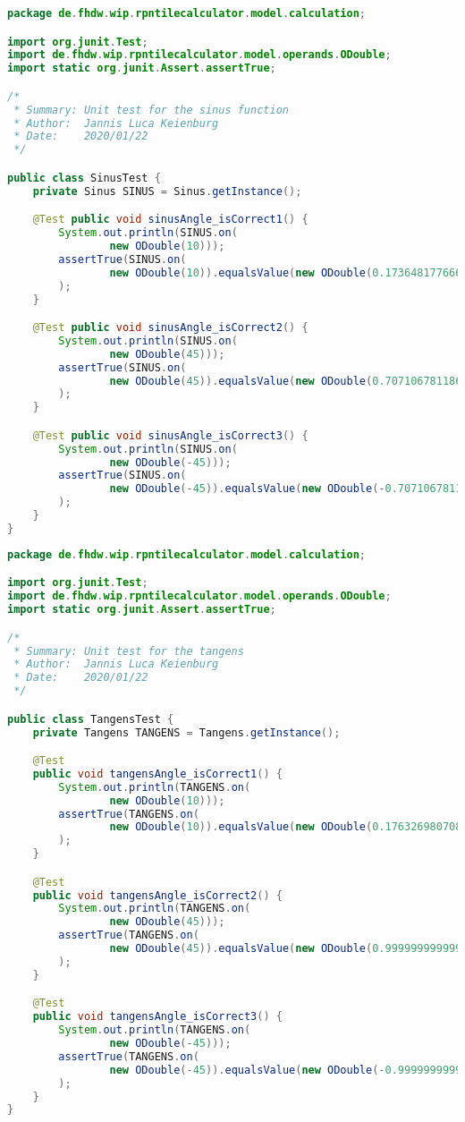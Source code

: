 \begin{lstlisting}[caption=SinusTest (Keienburg),label=list:SinusTest,language=Java]
package de.fhdw.wip.rpntilecalculator.model.calculation;

import org.junit.Test;
import de.fhdw.wip.rpntilecalculator.model.operands.ODouble;
import static org.junit.Assert.assertTrue;

/*
 * Summary: Unit test for the sinus function
 * Author:  Jannis Luca Keienburg
 * Date:    2020/01/22
 */

public class SinusTest {
    private Sinus SINUS = Sinus.getInstance();

    @Test public void sinusAngle_isCorrect1() {
        System.out.println(SINUS.on(
                new ODouble(10)));
        assertTrue(SINUS.on(
                new ODouble(10)).equalsValue(new ODouble(0.17364817766693033))
        );
    }

    @Test public void sinusAngle_isCorrect2() {
        System.out.println(SINUS.on(
                new ODouble(45)));
        assertTrue(SINUS.on(
                new ODouble(45)).equalsValue(new ODouble(0.7071067811865475))
        );
    }

    @Test public void sinusAngle_isCorrect3() {
        System.out.println(SINUS.on(
                new ODouble(-45)));
        assertTrue(SINUS.on(
                new ODouble(-45)).equalsValue(new ODouble(-0.7071067811865475))
        );
    }
}
\end{lstlisting} 

\begin{lstlisting}[caption=TangensTest (Schwenke),label=list:TangensTest,language=Java]
package de.fhdw.wip.rpntilecalculator.model.calculation;

import org.junit.Test;
import de.fhdw.wip.rpntilecalculator.model.operands.ODouble;
import static org.junit.Assert.assertTrue;

/*
 * Summary: Unit test for the tangens
 * Author:  Jannis Luca Keienburg
 * Date:    2020/01/22
 */

public class TangensTest {
    private Tangens TANGENS = Tangens.getInstance();

    @Test
    public void tangensAngle_isCorrect1() {
        System.out.println(TANGENS.on(
                new ODouble(10)));
        assertTrue(TANGENS.on(
                new ODouble(10)).equalsValue(new ODouble(0.17632698070846498))
        );
    }

    @Test
    public void tangensAngle_isCorrect2() {
        System.out.println(TANGENS.on(
                new ODouble(45)));
        assertTrue(TANGENS.on(
                new ODouble(45)).equalsValue(new ODouble(0.9999999999999999))
        );
    }

    @Test
    public void tangensAngle_isCorrect3() {
        System.out.println(TANGENS.on(
                new ODouble(-45)));
        assertTrue(TANGENS.on(
                new ODouble(-45)).equalsValue(new ODouble(-0.9999999999999999))
        );
    }
}
\end{lstlisting} 

